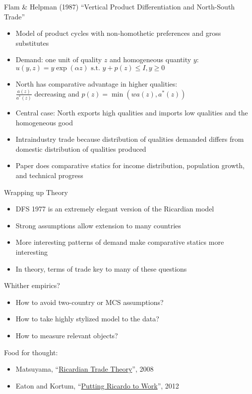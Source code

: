 \documentclass[10pt,notes=hide]{beamer}
\begin{document}
\begin{frame}{Flam \& Helpman (1987)}
``Vertical Product Differentiation and North-South Trade''
\begin{itemize}
	\item Model of product cycles with non-homothetic preferences and gross substitutes
	\item Demand: one unit of quality $z$ and homogeneous quantity $y$:\\
	$u(y,z)=y\exp(\alpha z) \text{ s.t. } y+p(z) \leq I, y \geq 0$
	\item North has comparative advantage in higher qualities:\\
	$\frac{a(z)}{a^*(z)}$ decreasing and $p(z)=\min(wa(z),a^*(z))$
	\item Central case: North exports high qualities and imports low qualities and the homogeneous good
	\item Intraindustry trade because distribution of qualities demanded differs from domestic distribution of qualities produced
	\item Paper does comparative statics for income distribution, population growth, and technical progress
\end{itemize}
\end{frame}
\begin{frame}{Wrapping up}
Theory
\begin{itemize}
	\item DFS 1977 is an extremely elegant version of the Ricardian model
	\item Strong assumptions allow extension to many countries
	\item More interesting patterns of demand make comparative statics more interesting
	\item In theory, terms of trade key to many of these questions
\end{itemize}
Whither empirics?
\begin{itemize}
	\item How to avoid two-country or MCS assumptions?
	\item How to take highly stylized model to the data?
	\item How to measure relevant objects?
\end{itemize}
Food for thought:
\begin{itemize}
	\item Matsuyama, ``\href{http://faculty.wcas.northwestern.edu/\~kmatsu/Ricardian\%20Trade\%20Theory.pdf}{Ricardian Trade Theory}'', 2008
	\item Eaton and Kortum, ``\href{https://www.aeaweb.org/articles?id=10.1257/jep.26.2.65}{Putting Ricardo to Work}'', 2012
\end{itemize}
\end{frame}
\end{document}
